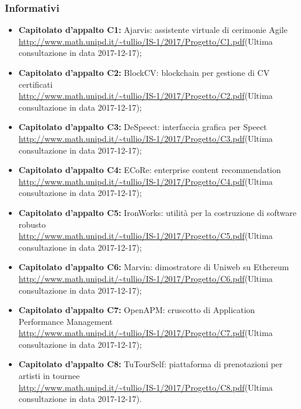 		\subsubsection{Informativi}
		\begin{itemize}
 			\item \textbf{Capitolato d'appalto C1:} Ajarvis: assistente virtuale di cerimonie Agile \\ \url{http://www.math.unipd.it/~tullio/IS-1/2017/Progetto/C1.pdf}(Ultima consultazione in data {2017-12-17});
 			\item \textbf{Capitolato d'appalto C2:} BlockCV: blockchain per gestione di CV certificati \\ \url{http://www.math.unipd.it/~tullio/IS-1/2017/Progetto/C2.pdf}(Ultima consultazione in data {2017-12-17});
 			\item \textbf{Capitolato d'appalto C3:} DeSpeect: interfaccia grafica per Speect \\ \url{http://www.math.unipd.it/~tullio/IS-1/2017/Progetto/C3.pdf}(Ultima consultazione in data {2017-12-17});
 			\item \textbf{Capitolato d'appalto C4:} ECoRe: enterprise content recommendation \\ \url{http://www.math.unipd.it/~tullio/IS-1/2017/Progetto/C4.pdf}(Ultima consultazione in data {2017-12-17});
 			\item \textbf{Capitolato d'appalto C5:} IronWorks: utilità per la costruzione di software robusto \\ \url{http://www.math.unipd.it/~tullio/IS-1/2017/Progetto/C5.pdf}(Ultima consultazione in data {2017-12-17});
 			\item \textbf{Capitolato d'appalto C6:} Marvin: dimostratore di Uniweb su Ethereum \\ \url{http://www.math.unipd.it/~tullio/IS-1/2017/Progetto/C6.pdf}(Ultima consultazione in data {2017-12-17});
 			\item \textbf{Capitolato d'appalto C7:} OpenAPM: cruscotto di Application Performance Management \\ \url{http://www.math.unipd.it/~tullio/IS-1/2017/Progetto/C7.pdf}(Ultima consultazione in data {2017-12-17});
 			\item \textbf{Capitolato d'appalto C8:} TuTourSelf: piattaforma di prenotazioni per artisti in tournee \\ \url{http://www.math.unipd.it/~tullio/IS-1/2017/Progetto/C8.pdf}(Ultima consultazione in data {2017-12-17}).
 			
		\end{itemize}
		


